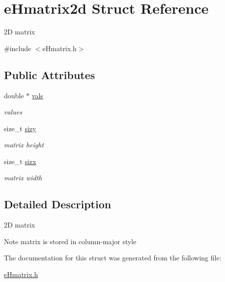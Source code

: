 \hypertarget{structeHmatrix2d}{\section{e\-Hmatrix2d Struct Reference}
\label{structeHmatrix2d}
}


2\-D matrix  




{\ttfamily \#include $<$e\-Hmatrix.\-h$>$}

\subsection*{Public Attributes}
\begin{DoxyCompactItemize}
\item 
\hypertarget{structeHmatrix2d_ad9717a9a226ced718cdc881a096e4313}{double $\ast$ \hyperlink{structeHmatrix2d_ad9717a9a226ced718cdc881a096e4313}{vals}}\label{structeHmatrix2d_ad9717a9a226ced718cdc881a096e4313}

\begin{DoxyCompactList}\small\item\em values \end{DoxyCompactList}\item 
\hypertarget{structeHmatrix2d_a870ac9180e3a8f005dea6eb41299cc66}{size\-\_\-t \hyperlink{structeHmatrix2d_a870ac9180e3a8f005dea6eb41299cc66}{sizy}}\label{structeHmatrix2d_a870ac9180e3a8f005dea6eb41299cc66}

\begin{DoxyCompactList}\small\item\em matrix height \end{DoxyCompactList}\item 
\hypertarget{structeHmatrix2d_a980169b692f246eb013b8b2c17c2aad9}{size\-\_\-t \hyperlink{structeHmatrix2d_a980169b692f246eb013b8b2c17c2aad9}{sizx}}\label{structeHmatrix2d_a980169b692f246eb013b8b2c17c2aad9}

\begin{DoxyCompactList}\small\item\em matrix width \end{DoxyCompactList}\end{DoxyCompactItemize}


\subsection{Detailed Description}
2\-D matrix 

\begin{DoxyNote}{Note}
matrix is stored in column-\/major style 
\end{DoxyNote}


The documentation for this struct was generated from the following file\-:\begin{DoxyCompactItemize}
\item 
\hyperlink{eHmatrix_8h}{e\-Hmatrix.\-h}\end{DoxyCompactItemize}
